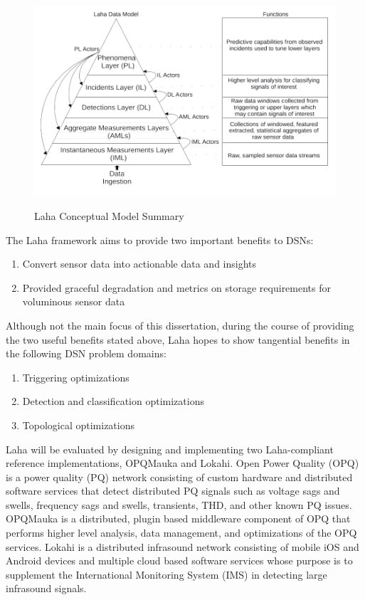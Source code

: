 \begin{figure}
	\caption{Laha Conceptual Model Summary}
	\centering
	\includegraphics{figures/laha_abstract_overview.png}
	\label{laha-abstract-overview}
\end{figure}

The Laha framework aims to provide two important benefits to DSNs:
\begin{enumerate}
	\item Convert sensor data into actionable data and insights
	\item Provided graceful degradation and metrics on storage requirements for voluminous sensor data
\end{enumerate}

Although not the main focus of this dissertation, during the course of providing the two useful benefits stated above, Laha hopes to show tangential benefits in the following DSN problem domains:

\begin{enumerate}
	\item Triggering optimizations
	\item Detection and classification optimizations
	\item Topological optimizations
\end{enumerate}

Laha will be evaluated by designing and implementing two Laha-compliant reference implementations, OPQMauka and Lokahi. Open Power Quality (OPQ) is a power quality (PQ) network consisting of custom hardware and distributed software services that detect distributed PQ signals such as voltage sags and swells, frequency sags and swells, transients, THD, and other known PQ issues. OPQMauka is a distributed, plugin based middleware component of OPQ that performs higher level analysis, data management, and optimizations of the OPQ services. Lokahi is a distributed infrasound network consisting of mobile iOS and Android devices and multiple cloud based software services whose purpose is to supplement the International Monitoring System (IMS) in detecting large infrasound signals.

